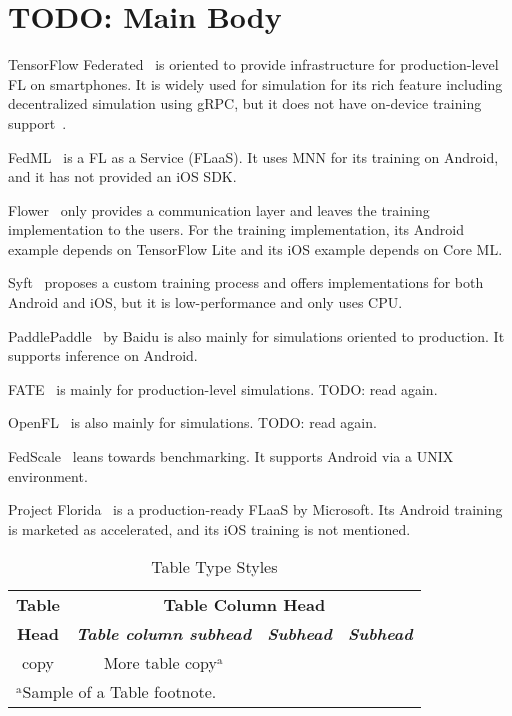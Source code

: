 \documentclass[conference]{IEEEtran}
\begin{document}
\section{TODO: Main Body}

TensorFlow Federated~\cite{tensorflow2015-whitepaper} is oriented to
provide infrastructure for production-level FL on smartphones.
It is widely used for simulation for its rich feature including
decentralized simulation using gRPC,
but it does not have on-device training support~\cite{kholod2020open}.

FedML~\cite{he2020fedml} is a FL as a Service (FLaaS).
It uses MNN for its training on Android,
and it has not provided an iOS SDK.

Flower~\cite{beutel2020flower,mathur2021ondevice}
only provides a communication layer and
leaves the training implementation to the users.
For the training implementation,
its Android example depends on TensorFlow Lite and
its iOS example depends on Core ML.

Syft~\cite{ryffel2018generic,Ziller2021,hall2021syft}
proposes a custom training process and
offers implementations for both Android and iOS,
but it is low-performance and only uses CPU.

PaddlePaddle~\cite{ma2019paddlepaddle} by Baidu is
also mainly for simulations oriented to production.
It supports inference on Android.

FATE~\cite{liu2021fate} is mainly for production-level simulations.
TODO: read again.

OpenFL~\cite{patrick2022openfl} is also mainly for simulations.
TODO: read again.

FedScale~\cite{lai2022fedscale} leans towards benchmarking.
It supports Android via a UNIX environment.

Project Florida~\cite{madrigal2023project}
is a production-ready FLaaS by Microsoft.
Its Android training is marketed as accelerated,
and its iOS training is not mentioned.


\begin{table}[htbp]
\caption{Table Type Styles}
\begin{center}
\begin{tabular}{|c|c|c|c|}
\hline
\textbf{Table}&\multicolumn{3}{|c|}{\textbf{Table Column Head}} \\
\cline{2-4} 
\textbf{Head} & \textbf{\textit{Table column subhead}}& \textbf{\textit{Subhead}}& \textbf{\textit{Subhead}} \\
\hline
copy& More table copy$^{\mathrm{a}}$& &  \\
\hline
\multicolumn{4}{l}{$^{\mathrm{a}}$Sample of a Table footnote.}
\end{tabular}
\label{tab1}
\end{center}
\end{table}
\end{document}
